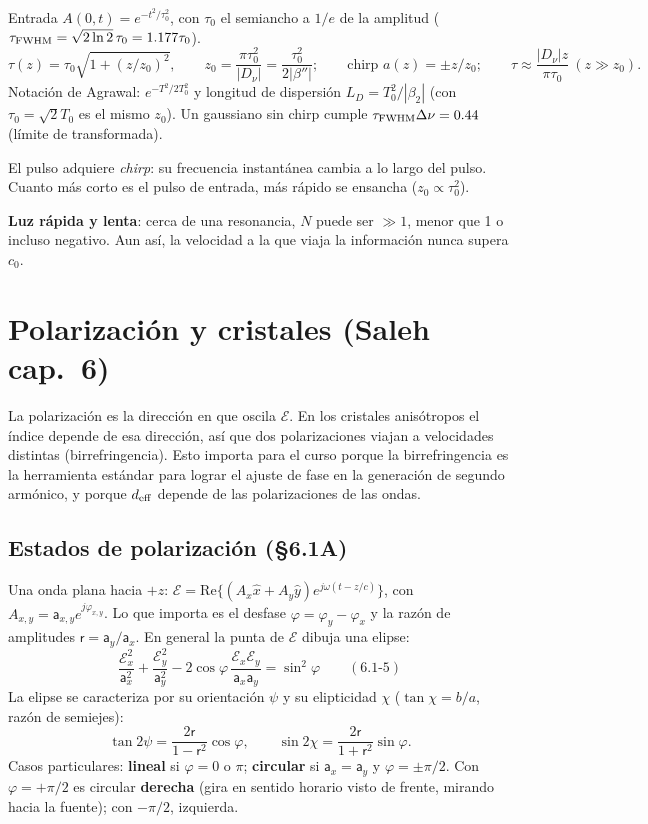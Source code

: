 \documentclass[10pt]{article}
\newcommand{\Ec}{\boldsymbol{\mathcal E}}
\begin{document}
\begin{clave}[title={Pulso gaussiano en un medio dispersivo}]
Entrada $A(0,t)=e^{-t^2/\tau_0^2}$, con $\tau_0$ el semiancho a $1/e$ de la amplitud ($\tau_{\rm FWHM}=\sqrt{2\ln2}\,\tau_0=1.177\tau_0$).
\[
\tau(z)=\tau_0\sqrt{1+(z/z_0)^2},\qquad z_0=\frac{\pi\tau_0^2}{|D_\nu|}=\frac{\tau_0^2}{2|\beta''|};\qquad \text{chirp }a(z)=\pm z/z_0;\qquad \tau\approx\frac{|D_\nu|z}{\pi\tau_0}\ (z\gg z_0).
\]
Notación de Agrawal: $e^{-T^2/2T_0^2}$ y longitud de dispersión $L_D=T_0^2/|\beta_2|$ (con $\tau_0=\sqrt2T_0$ es el mismo $z_0$). Un gaussiano sin chirp cumple $\tau_{\rm FWHM}\Delta\nu=0.44$ (límite de transformada).
\end{clave}
El pulso adquiere \emph{chirp}: su frecuencia instantánea cambia a lo largo del pulso. Cuanto más corto es el pulso de entrada, más rápido se ensancha ($z_0\propto\tau_0^2$).

\textbf{Luz rápida y lenta}: cerca de una resonancia, $N$ puede ser $\gg1$, menor que 1 o incluso negativo. Aun así, la velocidad a la que viaja la información nunca supera $c_0$.

\section{Polarización y cristales (Saleh cap.~6)}

\begin{idea}
La polarización es la dirección en que oscila $\Ec$. En los cristales anisótropos el índice depende de esa dirección, así que dos polarizaciones viajan a velocidades distintas (birrefringencia). Esto importa para el curso porque la birrefringencia es la herramienta estándar para lograr el ajuste de fase en la generación de segundo armónico, y porque $d_{\rm eff}$ depende de las polarizaciones de las ondas.
\end{idea}

\subsection{Estados de polarización (§6.1A)}
Una onda plana hacia $+z$: $\Ec=\mathrm{Re}\{(A_x\hat x+A_y\hat y)e^{j\omega(t-z/c)}\}$, con $A_{x,y}=\mathsf a_{x,y}e^{j\varphi_{x,y}}$. Lo que importa es el desfase $\varphi=\varphi_y-\varphi_x$ y la razón de amplitudes $\mathsf r=\mathsf a_y/\mathsf a_x$. En general la punta de $\Ec$ dibuja una elipse:
\[
\frac{\mathcal E_x^2}{\mathsf a_x^2}+\frac{\mathcal E_y^2}{\mathsf a_y^2}-2\cos\varphi\,\frac{\mathcal E_x\mathcal E_y}{\mathsf a_x\mathsf a_y}=\sin^2\varphi\qquad(6.1\text{-}5)
\]
La elipse se caracteriza por su orientación $\psi$ y su elipticidad $\chi$ ($\tan\chi=b/a$, razón de semiejes):
\[
\tan2\psi=\frac{2\mathsf r}{1-\mathsf r^2}\cos\varphi,\qquad \sin2\chi=\frac{2\mathsf r}{1+\mathsf r^2}\sin\varphi .
\]
Casos particulares: \textbf{lineal} si $\varphi=0$ o $\pi$; \textbf{circular} si $\mathsf a_x=\mathsf a_y$ y $\varphi=\pm\pi/2$. Con $\varphi=+\pi/2$ es circular \textbf{derecha} (gira en sentido horario visto de frente, mirando hacia la fuente); con $-\pi/2$, izquierda.
\end{document}

